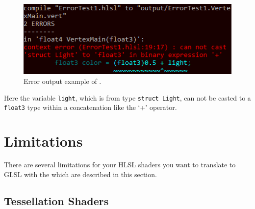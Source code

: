 \documentclass{article}
\begin{document}
\begin{figure}[H]
	\centering
	\includegraphics{images/error_output2}
	\caption{Error output example of \XSC.}
	\label{fig:error_output2}
\end{figure}
Here the variable \texttt{light}, which is from type \texttt{struct Light}, can not be casted
to a \texttt{float3} type within a concatenation like the `+' operator.








\newpage
\section{Limitations}

There are several limitations for your HLSL shaders you want to translate to GLSL with the \XSC
which are described in this section.

\subsection{Tessellation Shaders}
\end{document}
